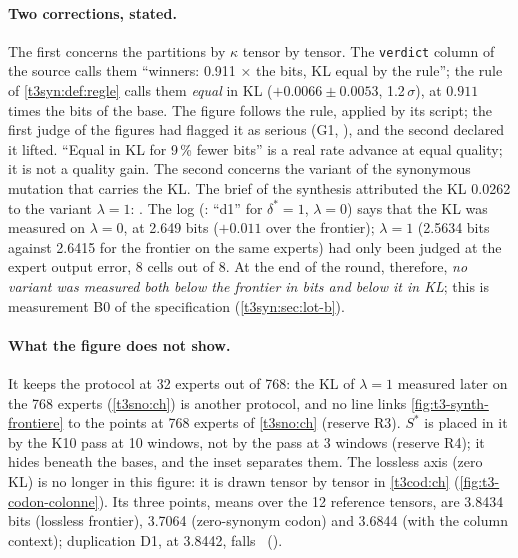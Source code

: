 \paragraph{Two corrections, stated.} The first concerns the partitions by $\kappa$ tensor by tensor. The \texttt{verdict} column of the source calls them ``winners: 0.911 × the bits, KL equal by the rule''; the rule of \cref{t3syn:def:regle} calls them \emph{equal} in KL ($+0.0066 \pm 0.0053$, 1.2\,$\sigma$), at $0.911$ times the bits of the base. The figure follows the rule, applied by its script; the first judge of the figures had flagged it as serious (G1, ), and the second declared it lifted. ``Equal in KL for 9\,\% fewer bits'' is a real rate advance at equal quality; it is not a quality gain. The second concerns the variant of the synonymous mutation that carries the KL. The brief of the synthesis attributed the KL 0.0262 to the variant $\lambda = 1$: . The log (: ``d1'' for $\delta^{*} = 1$, $\lambda = 0$) says that the KL was measured on $\lambda = 0$, at \num{2.649} bits ($+0.011$ over the frontier); $\lambda = 1$ (\num{2.5634} bits against \num{2.6415} for the frontier on the same experts) had only been judged at the expert output error, 8 cells out of 8. At the end of the round, therefore, \emph{no variant was measured both below the frontier in bits and below it in KL}; this is measurement B0 of the specification (\cref{t3syn:sec:lot-b}).

\paragraph{What the figure does not show.} It keeps the protocol at 32 experts out of 768: the KL of $\lambda = 1$ measured later on the 768 experts (\cref{t3sno:ch}) is another protocol, and no line links \cref{fig:t3-synth-frontiere} to the points at 768 experts of \cref{t3sno:ch} (reserve R3). $S^{*}$ is placed in it by the K10 pass at 10 windows, not by the pass at 3 windows (reserve R4); it hides beneath the bases, and the inset separates them. The lossless axis (zero KL) is no longer in this figure: it is drawn tensor by tensor in \cref{t3cod:ch} (\cref{fig:t3-codon-colonne}). Its three points, means over the 12 reference tensors, are \num{3.8434} bits (lossless frontier), \num{3.7064} (zero-synonym codon) and \num{3.6844} (with the column context); duplication D1, at \num{3.8442}, falls \mes~().

